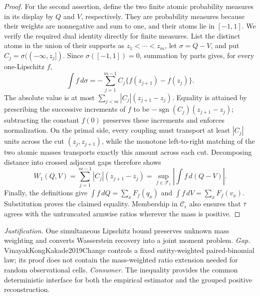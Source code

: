 \documentclass{article}
\begin{document}
\begin{proof}
For the second assertion, define the two finite atomic probability measures in its display by \(Q\) and \(V\), respectively.  They are probability measures because their weights are nonnegative and sum to one, and their atoms lie in \([-1,1]\).  We verify the required dual identity directly for finite measures.  List the distinct atoms in the union of their supports as \(z_1<\cdots<z_m\), let \(\sigma=Q-V\), and put \(C_j=\sigma(({-}\infty,z_j])\).  Since \(\sigma([-1,1])=0\), summation by parts gives, for every one-Lipschitz \(f\),
\[
\int f\,d\sigma=-\sum_{j=1}^{m-1}C_j\{f(z_{j+1})-f(z_j)\}.
\]
The absolute value is at most \(\sum_{j<m}|C_j|(z_{j+1}-z_j)\).  Equality is attained by prescribing the successive increments of \(f\) to be \(-\operatorname{sgn}(C_j)(z_{j+1}-z_j)\); subtracting the constant \(f(0)\) preserves these increments and enforces normalization.  On the primal side, every coupling must transport at least \(|C_j|\) units across the cut \((z_j,z_{j+1})\), while the monotone left-to-right matching of the two atomic masses transports exactly this amount across each cut.  Decomposing distance into crossed adjacent gaps therefore shows
\[
W_1(Q,V)=\sum_{j=1}^{m-1}|C_j|(z_{j+1}-z_j)
=\sup_{f\in\mathcal F_1}\left|\int f\,d(Q-V)\right|.
\]
Finally, the definitions give \(\int f\,dQ=\sum_xF_f(q_x)\) and \(\int f\,dV=\sum_xF_f(v_x)\).  Substitution proves the claimed equality.  Membership in \(\mathcal C_\epsilon\) also ensures that \(\bar\tau\) agrees with the untruncated armwise ratios wherever the mass is positive.
\end{proof}
\par\smallskip\noindent \textit{Justification.} One simultaneous Lipschitz bound preserves unknown mass weighting and converts Wasserstein recovery into a joint moment problem. \textit{Gap.} VinayakKongKakade2019Change controls a fixed entity-weighted paired-binomial law; its proof does not contain the mass-weighted ratio extension needed for random observational cells. \textit{Consumer.} The inequality provides the common deterministic interface for both the empirical estimator and the grouped positive reconstruction.
\end{document}
